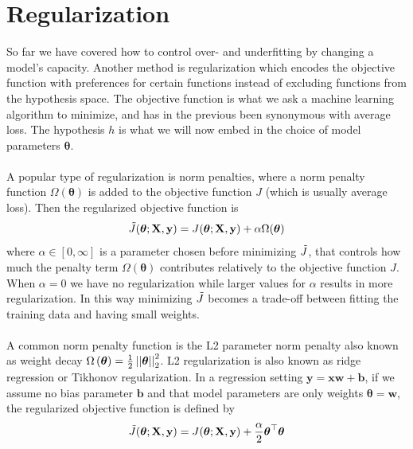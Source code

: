 \section{Regularization}\label{sec:regularization}
So far we have covered how to control over- and underfitting by changing a model's capacity. Another method is regularization which encodes the objective function with preferences for certain functions instead of excluding functions from the hypothesis space. The objective function is what we ask a machine learning algorithm to minimize, and has in the previous been synonymous with average loss. The hypothesis $h$ is what we will now embed in the choice of model parameters $\boldsymbol{\theta}$.\\
\\
A popular type of regularization is norm penalties, where a norm penalty function $\Omega(\boldsymbol{\theta})$ is added to the objective function  $J$ (which is usually average loss). Then the regularized objective function is
\begin{equation} \label{eq:reg_obj_func}
    \Tilde{J}(\boldsymbol{\theta}; \mathbf{X}, \mathbf{y}) = J(\boldsymbol{\theta}; \mathbf{X}, \mathbf{y}) + \alpha \Omega(\boldsymbol{\theta})
\end{equation}
where $\alpha \in [0, \infty]$ is a parameter chosen before minimizing $\Tilde{J}$, that controls how much the penalty term $ \Omega(\boldsymbol{\theta})$ contributes relatively to the objective function $J$. When $\alpha=0$ we have no regularization while larger values for $\alpha$ results in more regularization. In this way minimizing $ \Tilde{J}$ becomes a trade-off between fitting the training data and having small weights.\\
\\
A common norm penalty function is the L2 parameter norm penalty also known as weight decay $\Omega \left (\boldsymbol{\theta}\right) = \frac{1}{2} \left |\left |\boldsymbol{\theta}\right|\right|_2^2$. L2 regularization is also known as ridge regression or Tikhonov regularization. In a regression setting $\boldsymbol{y} = \boldsymbol{x} \boldsymbol{w} + \boldsymbol{b}$, if we assume no bias parameter $\boldsymbol{b}$ and that model parameters are only weights $\boldsymbol{\theta} = \boldsymbol{w}$, the regularized objective function is defined by
\begin{equation} \label{eq:L2_reg}
    \Tilde{J}(\boldsymbol{\theta}; \mathbf{X}, \mathbf{y}) = J(\boldsymbol{\theta}; \mathbf{X}, \mathbf{y}) + \frac{\alpha}{2} \boldsymbol{\theta}^\top \boldsymbol{\theta}
\end{equation}
